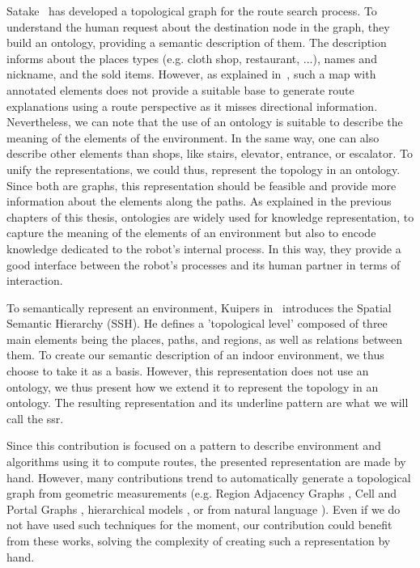 Satake~\cite{satake_2015_field} has developed a topological graph for the route search process. To understand the human request about the destination node in the graph, they build an ontology, providing a semantic description of them. The description informs about the places types (e.g. cloth shop, restaurant, ...), names and nickname, and the sold items. However, as explained in~\cite{morales_2015_building}, such a map with annotated elements does not provide a suitable base to generate route explanations using a route perspective as it misses directional information. Nevertheless, we can note that the use of an ontology is suitable to describe the meaning of the elements of the environment. In the same way, one can also describe other elements than shops, like stairs, elevator, entrance, or escalator. To unify the representations, we could thus, represent the topology in an ontology. Since both are graphs, this representation should be feasible and provide more information about the elements along the paths. As explained in the previous chapters of this thesis, ontologies are widely used for knowledge representation, to capture the meaning of the elements of an environment but also to encode knowledge dedicated to the robot's internal process. In this way, they provide a good interface between the robot's processes and its human partner in terms of interaction.%

To semantically represent an environment, Kuipers in~\cite{kuipers_2000_spatial} introduces the Spatial Semantic Hierarchy (SSH). He defines a 'topological level' composed of three main elements being the places, paths, and regions, as well as relations between them. To create our semantic description of an indoor environment, we thus choose to take it as a basis. However, this representation does not use an ontology, we thus present how we extend it to represent the topology in an ontology. The resulting representation and its underline pattern are what we will call the \acrfull{ssr}.

Since this contribution is focused on a pattern to describe environment and algorithms using it to compute routes, the presented representation are made by hand. However, many contributions trend to automatically generate a topological graph from geometric measurements (e.g. Region Adjacency Graphs \cite{kuipers_2004_local}, Cell and Portal Graphs \cite{lefebvre_2003_automatic}, hierarchical models \cite{lorenz_2006_hybrid}, or from natural language \cite{hemachandra_2014_learning}). Even if we do not have used such techniques for the moment, our contribution could benefit from these works, solving the complexity of creating such a representation by hand.

